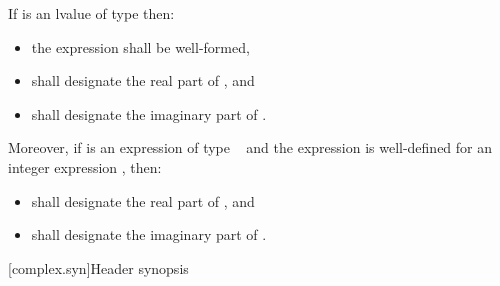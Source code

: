 \pnum
If  is an lvalue of type \cv{}  then:

\begin{itemize}
\item the expression  shall be well-formed,
\item {} shall designate the real part of , and
\item {} shall designate the imaginary part of .
\end{itemize}

Moreover, if  is an expression of type \cv{}~ and the expression  is well-defined for an integer expression , then:

\begin{itemize}
\item {} shall designate the real part of , and
\item {} shall designate the imaginary part of .
\end{itemize}

[complex.syn]{Header  synopsis}

